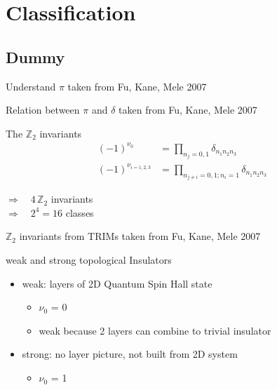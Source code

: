 \documentclass[xcolor=x11names,compress,professionalfonts]{beamer}
\renewcommand{\(}{\begin{columns}}
\renewcommand{\)}{\end{columns}}
\newcommand{\<}[1]{\begin{column}{#1}}
\renewcommand{\>}{\end{column}}
\begin{document}
\section{Classification}
\subsection{Dummy}

\begin{frame}{Understand $\pi$}
    \scriptsize
    taken from Fu, Kane, Mele 2007
\end{frame}

\begin{frame}{Relation between $\pi$ and $\delta$}
    \scriptsize
    taken from Fu, Kane, Mele 2007
\end{frame}


\begin{frame}{The $\mathbb{Z}_2$ invariants}
    \begin{align*}
        (-1)^{\nu_0} &= \prod_{n_j=0,1}{\delta_{n_1 n_2 n_3}} \\
        (-1)^{\nu_{i=1,2,3}} &= \prod_{n_{j\neq i}=0,1; n_i=1}{\delta_{n_1 n_2 n_3}}
    \end{align*}

$\Rightarrow \quad 4 \, \mathbb{Z}_2$ invariants \\
    $\Rightarrow \quad 2^4=16$ classes 
\end{frame}

    
\begin{frame}{$\mathbb{Z}_2$ invariants from TRIMs}
    \scriptsize
    taken from Fu, Kane, Mele 2007

\end{frame}

\begin{frame}{weak and strong topological Insulators}
    \begin{itemize}
        \item weak: layers of 2D Quantum Spin Hall state
            \begin{itemize}
                \item $\nu_0$ = 0
                \item weak because 2 layers can combine to trivial insulator
            \end{itemize}
        \item strong: no layer picture, not built from 2D system
            \begin{itemize}
                \item $\nu_0$ = 1
            \end{itemize}
    \end{itemize}

    
\end{frame}
\end{document}
